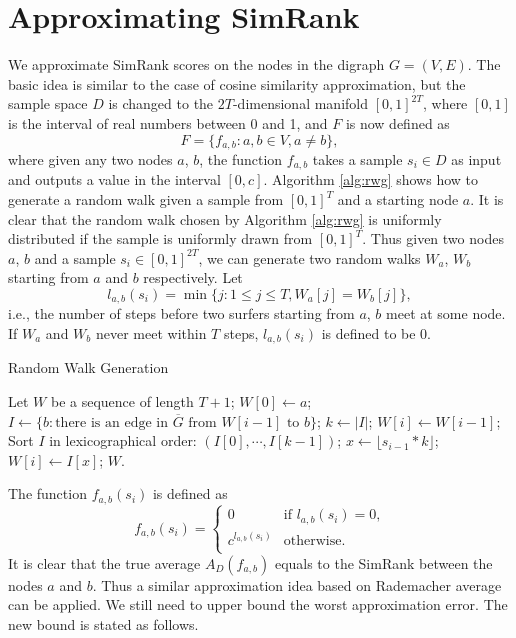 \documentclass{article}
\begin{document}
\section{Approximating SimRank}
\label{sec:asr}
We approximate SimRank scores on the nodes in the digraph $G=(V,E)$. 
The basic idea is similar to the case of cosine similarity approximation, but the sample space $D$ is changed to the $2T$-dimensional manifold $[0,1]^{2T}$, where $[0,1]$ is the interval of real numbers between 0 and 1, and $F$ is now defined as
$$F = \{f_{a,b} : a,b\in V, a\not= b\},$$
where given any two nodes $a$, $b$, the function $f_{a,b}$ takes a sample $s_i\in D$ as input and outputs a value in the interval $[0,c]$. Algorithm \ref{alg:rwg} shows how to generate a random walk given a sample from $[0,1]^T$ and a starting node $a$. It is clear that the random walk chosen by Algorithm \ref{alg:rwg} is uniformly distributed if the sample is uniformly drawn from $[0,1]^T$. Thus given two nodes $a$, $b$ and a sample $s_i \in [0,1]^{2T}$, we can generate two random walks $W_a$, $W_b$ starting from $a$ and $b$ respectively. Let 
$$l_{a,b}(s_i) = \min\{j: 1\leq j\leq T, W_a[j] = W_b[j]\},$$
i.e., the number of steps before two surfers starting from $a$, $b$ meet at some node. If $W_a$ and $W_b$ never meet within $T$ steps, $l_{a,b}(s_i)$ is defined to be 0.

\begin{algorithm}[!t]
\caption{\textsf{Random Walk Generation}}
\label{alg:rwg}
\renewcommand{\algorithmicrequire}{\textbf{Input:}}
\renewcommand{\algorithmicensure}{\textbf{Output:}}
\begin{algorithmic}
\State Let $W$ be a sequence of length $T+1$;
\State $W[0] \gets a$;
	\State $I \gets \{b: \textrm{there is an edge in $\overline{G}$ from $W[i-1]$ to $b$}\}$;
	\State $k \gets |I|$;
		\State $W[i] \gets W[i-1]$;
	\Else
		\State Sort $I$ in lexicographical order: $(I[0],\cdots,I[k-1])$;
		\State $x \gets \lfloor s_{i-1} * k \rfloor$;
		\State $W[i] \gets I[x]$;
	\EndIf
\EndFor
{} $W$.
\end{algorithmic}
\end{algorithm}

The function $f_{a,b}(s_i)$ is defined as 
$$f_{a,b}(s_i) =\begin{cases}
0 & \textrm{if $l_{a,b}(s_i)=0$,} \\
c^{l_{a,b}(s_i)} & \textrm{otherwise}.\\
\end{cases}$$
It is clear that the true average $A_D(f_{a,b})$ equals to the SimRank between the nodes $a$ and $b$. Thus a similar approximation idea based on Rademacher average can be applied. We still need to upper bound the worst approximation error. The new bound is stated as follows.
\end{document}

